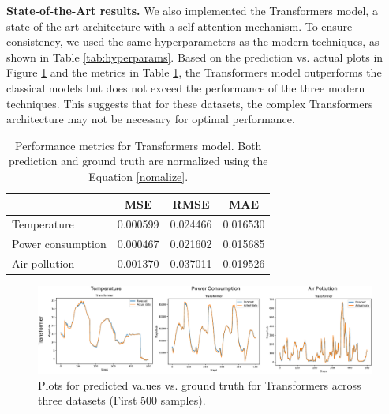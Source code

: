 \documentclass[sn-mathphys-num]{sn-jnl}
\theoremstyle{thmstyleone}%
\theoremstyle{thmstyletwo}%
\theoremstyle{thmstylethree}%
\begin{document}
\textbf{State-of-the-Art results.} We also implemented the Transformers model, a state-of-the-art architecture with a self-attention mechanism. To ensure consistency, we used the same hyperparameters as the modern techniques, as shown in Table \ref{tab:hyperparams}. Based on the prediction vs. actual plots in Figure \ref{fig:trans} and the metrics in Table \ref{tab:trans_metric}, the Transformers model outperforms the classical models but does not exceed the performance of the three modern techniques. This suggests that for these datasets, the complex Transformers architecture may not be necessary for optimal performance.
\begin{table}[h]
\centering
\begin{tabular}{@{}lccc@{}}
\toprule
\textbf{}               & \hspace{0.6cm} \textbf{MSE} & \textbf{RMSE} & \textbf{MAE} \\ \midrule
Temperature           & \hspace{0.6cm} 0.000599     & \hspace{1cm} 0.024466     \hspace{1cm} & 0.016530     \\
Power consumption       & \hspace{0.6cm} 0.000467     & 0.021602      & 0.015685     \\
Air pollution           & \hspace{0.6cm} 0.001370     & 0.037011      & 0.019526     \\ \bottomrule
\end{tabular}
\caption{Performance metrics for Transformers model. Both prediction and ground truth are normalized using the Equation \ref{nomalize}.}
\label{tab:trans_metric}
\end{table}
\begin{figure}[H]
	\begin{center}
		\includegraphics[scale=0.6]{trans.pdf}
	\end{center}
	\caption{Plots for predicted values vs. ground truth for Transformers across three datasets (First 500 samples).}
	\label{fig:trans}
\end{figure}
\end{document}
